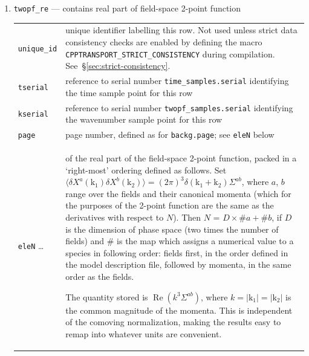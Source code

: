 \documentclass[11pt,a4paper]{article}
\newcommand{\vect}[1]{\bm{\mathrm{{#1}}}}
\newcommand{\semibold}[1]{{\fontseries{b}\selectfont{#1}}}
\newenvironment{sqltablelist}{\renewcommand{\arraystretch}{1.3}\small}{}
\DeclareMathOperator{\realpart}{Re}
\renewcommand{\Re}{\realpart}
\begin{document}
\begin{sqltablelist}
\begin{enumerate}
    \item \texttt{twopf_re} --- contains real part of field-space 2-point function \\
    \begin{tabular}{p{2.5cm}p{11.2cm}}
        \texttt{unique_id} & unique identifier labelling this row. Not used
        unless strict data consistency checks are enabled
        by defining the macro
        \texttt{CPPTRANSPORT_STRICT_CONSISTENCY} during
        compilation. See~\S\ref{sec:strict-consistency}. \\
        \texttt{tserial} & reference to serial number
        \texttt{time_samples.serial} identifying the time sample point for this row \\
        \texttt{kserial} & reference to serial number
        \texttt{twopf_samples.serial} identifying the wavenumber sample point for this row \\
        \texttt{page} & page number, defined as for \texttt{backg.page}; see
        \texttt{eleN} below \\
        \texttt{eleN} \ldots & \semibold{dimensionless components} of the real part of the field-space 2-point
        function, packed in a `right-most' ordering defined as follows.
        Set $\langle \delta X^a(\vect{k}_1) \delta X^b(\vect{k}_2) \rangle = (2\pi)^3 \delta(\vect{k}_1 + \vect{k}_2)
        \Sigma^{ab}$, where $a$, $b$ range over the fields and their
        canonical momenta
        (which for the purposes of the 2-point function are the same as the
        derivatives with respect to $N$).
        Then $N$ = $D \times \#a + \#b$, if $D$ is the dimension of phase
        space (two times the number of fields)
        and $\#$ is the map which assigns a numerical
        value to a species in following order:
        fields first, in the order defined in the model description file,
        followed by momenta, in the same order as the fields.
        
        The quantity stored is $\Re(k^3 \Sigma^{ab})$,
        where $k = |\vect{k}_1| = |\vect{k}_2|$
        is the common magnitude of the momenta.
        This is independent of the comoving normalization, making the results
        easy to remap into whatever units are convenient.
    \end{tabular}
    

\end{enumerate}
\end{sqltablelist}
\end{document}
